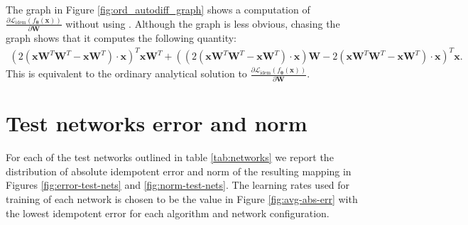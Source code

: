 \documentclass{article}
\theoremstyle{plain}
\theoremstyle{definition}
\theoremstyle{remark}
\newcommand{\vx}{\mathbf{x}}
\newcommand{\vW}{\mathbf{W}}
\newcommand{\vtheta}{\bm{\theta}}
\newcommand{\pd}[2]{\frac{\partial{#1}}{\partial{#2}}}
\begin{document}
The graph in Figure \ref{fig:ord_autodiff_graph} shows a computation of $\pd{\mathcal{L}_{\mathrm{idem}}(f_{\vtheta}(\vx))}{\vW}$ without using . Although the graph is less obvious, chasing the graph shows that it computes the following quantity:
%
\begin{align*}
    (2(\vx\vW^T\vW^T-\vx\vW^T) \cdot \vx)^T \vx\vW^T + ((2(\vx\vW^T\vW^T-\vx\vW^T) \cdot \vx) \vW - 2(\vx\vW^T\vW^T-\vx\vW^T) \cdot \vx)^T \vx.
\end{align*}
%
This is equivalent to the ordinary analytical solution to $\pd{\mathcal{L}_{\mathrm{idem}}(f_{\vtheta}(\vx))}{\vW}$.

\newpage
\section{Test networks error and norm}
\label{app:test-networks-data}

For each of the test networks outlined in table \ref{tab:networks} we report the distribution of absolute idempotent error and norm of the resulting mapping in Figures \ref{fig:error-test-nets} and \ref{fig:norm-test-nets}. The learning rates used for training of each network is chosen to be the value in Figure \ref{fig:avg-abs-err} with the lowest idempotent error for each algorithm and network configuration.
\end{document}
